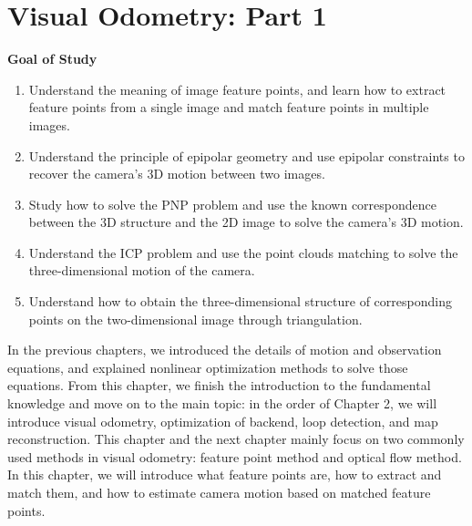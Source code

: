 \chapter{Visual Odometry: Part 1}
\label{cpt:7}
\thispagestyle{empty}

\begin{mdframed}  
	\textbf{Goal of Study}
	\begin{enumerate}[labelindent=0em,leftmargin=1.5em]
		\item Understand the meaning of image feature points, and learn how to extract feature points from a single image and match feature points in multiple images.
		\item Understand the principle of epipolar geometry and use epipolar constraints to recover the camera's 3D motion between two images.
		\item Study how to solve the PNP problem and use the known correspondence between the 3D structure and the 2D image to solve the camera's 3D motion.	
		\item Understand the ICP problem and use the point clouds matching to solve the three-dimensional motion of the camera.
		\item Understand how to obtain the three-dimensional structure of corresponding points on the two-dimensional image through triangulation.
	\end{enumerate}
\end{mdframed}

In the previous chapters, we introduced the details of motion and observation equations, and explained nonlinear optimization methods to solve those equations. From this chapter, we finish the introduction to the fundamental knowledge and move on to the main topic: in the order of Chapter 2, we will introduce visual odometry, optimization of backend, loop detection, and map reconstruction. This chapter and the next chapter mainly focus on two commonly used methods in visual odometry: feature point method and optical flow method. In this chapter, we will introduce what feature points are, how to extract and match them, and how to estimate camera motion based on matched feature points.

\newpage


\newpage

